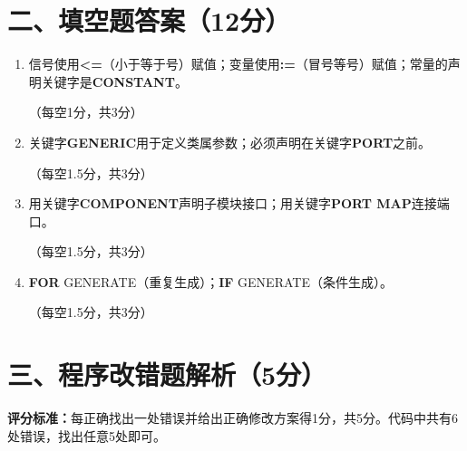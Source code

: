 \section{二、填空题答案（12分）}

\begin{enumerate}[label=\arabic*.]

\item 信号使用\textbf{<=}（小于等于号）赋值；变量使用\textbf{:=}（冒号等号）赋值；常量的声明关键字是\textbf{CONSTANT}。

（每空1分，共3分）

\item 关键字\textbf{GENERIC}用于定义类属参数；必须声明在关键字\textbf{PORT}之前。

（每空1.5分，共3分）

\item 用关键字\textbf{COMPONENT}声明子模块接口；用关键字\textbf{PORT MAP}连接端口。

（每空1.5分，共3分）

\item \textbf{FOR} GENERATE（重复生成）；\textbf{IF} GENERATE（条件生成）。

（每空1.5分，共3分）

\end{enumerate}

\section{三、程序改错题解析（5分）}

\begin{framed}
\textbf{评分标准：}每正确找出一处错误并给出正确修改方案得1分，共5分。代码中共有6处错误，找出任意5处即可。
\end{framed}

